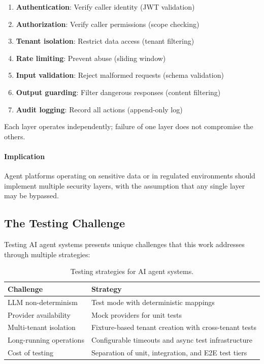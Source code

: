 \begin{enumerate}
    \item \textbf{Authentication}: Verify caller identity (JWT validation)
    \item \textbf{Authorization}: Verify caller permissions (scope checking)
    \item \textbf{Tenant isolation}: Restrict data access (tenant filtering)
    \item \textbf{Rate limiting}: Prevent abuse (sliding window)
    \item \textbf{Input validation}: Reject malformed requests (schema validation)
    \item \textbf{Output guarding}: Filter dangerous responses (content filtering)
    \item \textbf{Audit logging}: Record all actions (append-only log)
\end{enumerate}

Each layer operates independently; failure of one layer does not compromise the others.

\paragraph{Implication}
Agent platforms operating on sensitive data or in regulated environments should implement multiple security layers, with the assumption that any single layer may be bypassed.

\subsection{The Testing Challenge}

Testing AI agent systems presents unique challenges that this work addresses through multiple strategies:

\begin{table}[ht]
\centering
\caption{Testing strategies for AI agent systems.}
\label{tab:testing-strategies}
\begin{tabular}{p{4cm}p{8cm}}
\hline
\textbf{Challenge} & \textbf{Strategy} \\
\hline
LLM non-determinism & Test mode with deterministic mappings \\
Provider availability & Mock providers for unit tests \\
Multi-tenant isolation & Fixture-based tenant creation with cross-tenant tests \\
Long-running operations & Configurable timeouts and async test infrastructure \\
Cost of testing & Separation of unit, integration, and E2E test tiers \\
\hline
\end{tabular}
\end{table}

